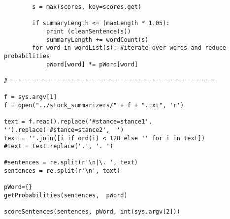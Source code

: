 \documentclass{article}
\begin{document}
\begin{verbatim}
        s = max(scores, key=scores.get)

        if summaryLength <= (maxLength * 1.05):
            print (cleanSentence(s))
            summaryLength += wordCount(s)
        for word in wordList(s): #iterate over words and reduce probabilities
            pWord[word] *= pWord[word]

#-----------------------------------------------------------

f = sys.argv[1]
f = open("../stock_summarizers/" + f + ".txt", 'r')

text = f.read().replace('#stance=stance1', '').replace('#stance=stance2', '')
text = ''.join([i if ord(i) < 128 else '' for i in text])
#text = text.replace('.', '. ')

#sentences = re.split(r'\n|\. ', text)
sentences = re.split(r'\n', text)

pWord={}
getProbabilities(sentences,  pWord)

scoreSentences(sentences, pWord, int(sys.argv[2]))


\end{verbatim}
\pagebreak
\end{document}

